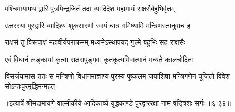 \twolineshloka
{पश्चिमायामथ द्वारि पुत्रमिन्द्रजितं तदा}
{व्यादिदेश महामायं राक्षसैर्बहुभिर्वृतम्} %

\twolineshloka
{उत्तरस्यां पुरद्वारि व्यादिश्य शुकसारणौ}
{स्वयं चात्र गमिष्यामि मन्त्रिणस्तानुवाच ह} %

\twolineshloka
{राक्षसं तु विरूपाक्षं महावीर्यपराक्रमम्}
{मध्यमेऽस्थापयद् गुल्मे बहुभिः सह राक्षसैः} %

\twolineshloka
{एवं विधानं लङ्कायां कृत्वा राक्षसपुङ्गवः}
{कृतकृत्यमिवात्मानं मन्यते कालचोदितः} %

\twolineshloka
{विसर्जयामास ततः स मन्त्रिणो विधानमाज्ञाप्य पुरस्य पुष्कलम्}
{जयाशिषा मन्त्रिगणेन पूजितो विवेश सोऽन्तःपुरमृद्धिमन्महत्} %


॥इत्यार्षे श्रीमद्रामायणे वाल्मीकीये आदिकाव्ये युद्धकाण्डे पुरद्वाररक्षा नाम षड्त्रिंशः सर्गः ॥६-३६॥

